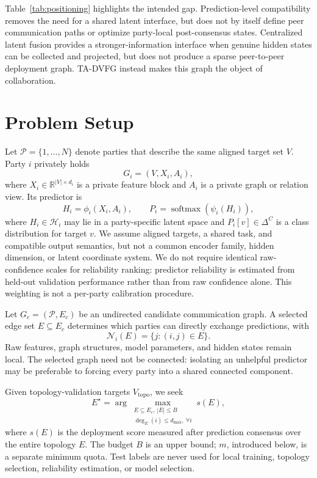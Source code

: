 \documentclass[letterpaper]{article} %
\newcommand{\method}{\textsc{TA-DVFG}}
\begin{document}
Table~\ref{tab:positioning} highlights the intended gap. Prediction-level
compatibility removes the need for a shared latent interface, but does not by
itself define peer communication paths or optimize party-local post-consensus
states. Centralized latent fusion provides a stronger-information interface when
genuine hidden states can be collected and projected, but does not produce a
sparse peer-to-peer deployment graph. \method{} instead makes this graph the
object of collaboration.

\section{Problem Setup}

Let $\mathcal{P}=\{1,\ldots,N\}$ denote parties that describe the same
aligned target set $V$. Party $i$ privately holds
\[
G_i=(V,X_i,A_i),
\]
where $X_i\in\mathbb{R}^{|V|\times d_i}$ is a private feature block and
$A_i$ is a private graph or relation view. Its predictor is
\begin{equation}
H_i=\phi_i(X_i,A_i), \qquad
P_i=\operatorname{softmax}(\psi_i(H_i)),
\label{eq:local_predictor}
\end{equation}
where $H_i\in\mathcal{H}_i$ may lie in a party-specific latent space and
$P_i[v]\in\Delta^C$ is a class distribution for target $v$. We assume
aligned targets, a shared task, and compatible output semantics, but not a
common encoder family, hidden dimension, or latent coordinate system. We do not require identical raw-confidence scales for reliability ranking:
predictor reliability is estimated from held-out validation performance rather
than from raw confidence alone. This weighting is not a per-party calibration
procedure.

Let $G_c=(\mathcal{P},E_c)$ be an undirected candidate communication graph.
A selected edge set $E\subseteq E_c$ determines which parties can directly
exchange predictions, with
\[
\mathcal{N}_i(E)=\{j:(i,j)\in E\}.
\]
Raw features, graph structures, model parameters, and hidden states remain
local. The selected graph need not be connected: isolating an unhelpful
predictor may be preferable to forcing every party into a shared connected
component.

Given topology-validation targets $V_{\mathrm{topo}}$, we seek
\begin{equation}
E^\star=
\arg\max_{\substack{
E\subseteq E_c,\ |E|\le B\\
\deg_E(i)\le d_{\max},\ \forall i
}}
s(E),
\label{eq:topology_objective}
\end{equation}
where $s(E)$ is the deployment score measured after prediction consensus over
the entire topology $E$. The budget $B$ is an upper bound; $m$, introduced
below, is a separate minimum quota. Test labels are never used for local
training, topology selection, reliability estimation, or model selection.
\end{document}
